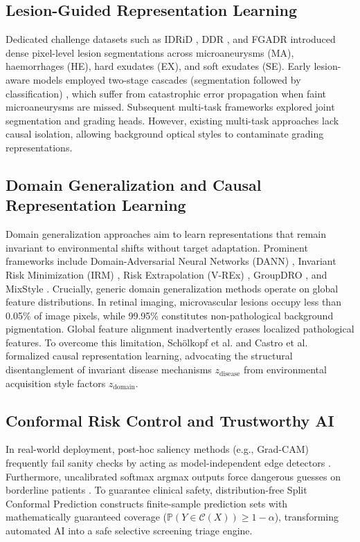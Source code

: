 \documentclass[journal,compsoc]{IEEEtran}
\begin{document}
\subsection{Lesion-Guided Representation Learning}
Dedicated challenge datasets such as IDRiD \cite{porwal2020idrid}, DDR \cite{li2019diagnostic}, and FGADR \cite{zhou2020fgadr} introduced dense pixel-level lesion segmentations across microaneurysms (MA), haemorrhages (HE), hard exudates (EX), and soft exudates (SE). Early lesion-aware models employed two-stage cascades (segmentation followed by classification) \cite{huang2021lesion}, which suffer from catastrophic error propagation when faint microaneurysms are missed. Subsequent multi-task frameworks \cite{lin2022multi, wang2024anatomically} explored joint segmentation and grading heads. However, existing multi-task approaches lack causal isolation, allowing background optical styles to contaminate grading representations.

\subsection{Domain Generalization and Causal Representation Learning}
Domain generalization approaches aim to learn representations that remain invariant to environmental shifts without target adaptation. Prominent frameworks include Domain-Adversarial Neural Networks (DANN) \cite{ganin2016domain}, Invariant Risk Minimization (IRM) \cite{arjovsky2019invariant}, Risk Extrapolation (V-REx) \cite{krueger2021out}, GroupDRO \cite{sagawa2020distributionally}, and MixStyle \cite{zhou2021domain}. Crucially, generic domain generalization methods operate on global feature distributions. In retinal imaging, microvascular lesions occupy less than 0.05\% of image pixels, while 99.95\% constitutes non-pathological background pigmentation. Global feature alignment inadvertently erases localized pathological features. To overcome this limitation, Sch\"olkopf et al. \cite{scholkopf2021toward} and Castro et al. \cite{castro2020causality} formalized causal representation learning, advocating the structural disentanglement of invariant disease mechanisms $z_{\text{disease}}$ from environmental acquisition style factors $z_{\text{domain}}$.

\subsection{Conformal Risk Control and Trustworthy AI}
In real-world deployment, post-hoc saliency methods (e.g., Grad-CAM) frequently fail sanity checks by acting as model-independent edge detectors \cite{adebayo2018sanity, arun2021assessing}. Furthermore, uncalibrated softmax argmax outputs force dangerous guesses on borderline patients \cite{guo2017calibration, kompa2021second}. To guarantee clinical safety, distribution-free Split Conformal Prediction \cite{vovk2005algorithmic, angelopoulos2021gentle} constructs finite-sample prediction sets with mathematically guaranteed coverage ($\mathbb{P}(Y \in \mathcal{C}(X)) \ge 1 - \alpha$), transforming automated AI into a safe selective screening triage engine.
\end{document}
